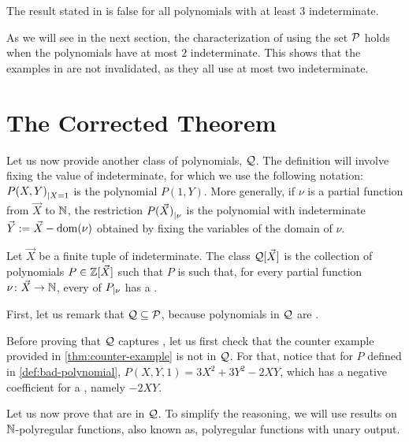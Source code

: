\documentclass[a4paper,11pt]{article}
\begin{document}
\begin{corollary}
    The result stated in \cite[Theorem 3.3]{KARH77} is false
    for all polynomials with at least $3$ indeterminate.
\end{corollary}

As we will see in the next section, the characterization
of  using the set $\mathcal{P}$
holds when the polynomials have at most $2$ indeterminate. This shows
that the examples in \cite{KARH77} are not invalidated, as they
all use at most two indeterminate.

\section{The Corrected Theorem}
\label{sec:proof}

Let us now provide another class of polynomials, $\mathcal{Q}$. The definition
will involve fixing the value of indeterminate, for which we use the following
notation: ${P(X,Y)}_{| X = 1}$ is the polynomial $P(1,Y)$. More generally,
if $\nu$ is a partial function from $\vec{X}$ to $\mathbb{N}$, the restriction
${P(\vec{X})}_{| \nu}$ is the polynomial with indeterminate $\vec{Y}
\mathrel{:=} \vec{X} - \operatorname{dom}(\nu)$ obtained by fixing the variables of the
domain of $\nu$.


\begin{definition}
    Let $\vec{X}$ be a finite tuple of indeterminate.
    The class $\mathcal{Q}[\vec{X}]$ is the collection of
    polynomials $P \in \mathbb{Z}[\vec{X}]$ such that
    $P$ is 
    such that, for every partial function $\nu \colon \vec{X} \to \mathbb{N}$,
    every  of
    ${P}_{| \nu}$ has a .
\end{definition}

First, let us remark that $\mathcal{Q} \subseteq \mathcal{P}$, because
polynomials in $\mathcal{Q}$ are .

Before proving that $\mathcal{Q}$ captures ,
let us first check that the counter example provided in
\cref{thm:counter-example} is not in $\mathcal{Q}$. For that, notice that for
$P$ defined in \cref{def:bad-polynomial}, $P(X,Y,1) = 3X^2 + 3Y^2 - 2XY$, which
has a negative coefficient for a , namely $-2XY$.

Let us now prove that  are
in $\mathcal{Q}$.
To simplify the reasoning, we will use results on $\mathbb{N}$-polyregular
functions, also known as, polyregular functions with unary output.
\end{document}

